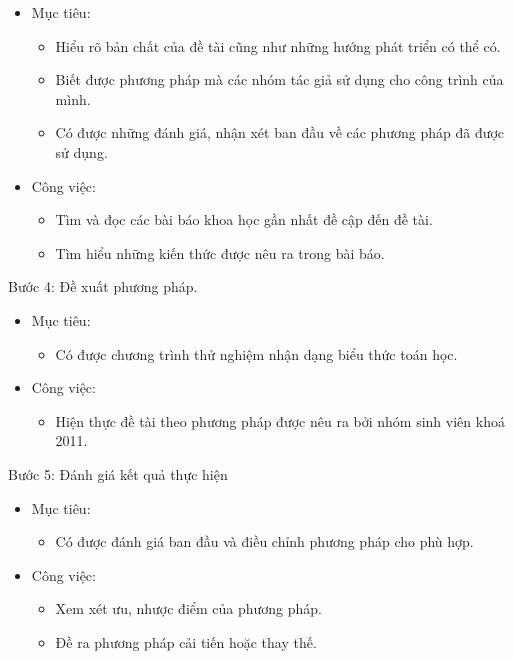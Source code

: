 \documentclass[a4paper,12pt]{article}
\begin{document}
	\begin{itemize}
		\item Mục tiêu: 
		\begin{itemize}
			\item Hiểu rõ bản chất của đề tài cũng như những hướng phát triển có thể có.
			\item Biết được phương pháp mà các nhóm tác giả sử dụng cho công trình của mình.
			\item Có được những đánh giá, nhận xét ban đầu về các phương pháp đã được sử dụng.
		\end{itemize}
		\item Công việc:
		\begin{itemize}
			\item Tìm và đọc các bài báo khoa học gần nhất đề cập đến đề tài.
			\item Tìm hiểu những kiến thức được nêu ra trong bài báo.
			
		\end{itemize}
	\end{itemize}
	Bước 4: Đề xuất phương pháp.
	\begin{itemize}
		\item Mục tiêu:
		\begin{itemize}
			\item Có được chương trình thử nghiệm nhận dạng biểu thức toán học.
			
		\end{itemize}
		\item Công việc:
		\begin{itemize}
			\item Hiện thực đề tài theo phương pháp được nêu ra bởi nhóm sinh viên khoá 2011.
			
		\end{itemize}
	\end{itemize}
	Bước 5: Đánh giá kết quả thực hiện
	\begin{itemize}
		\item Mục tiêu:
		\begin{itemize}
			\item Có được đánh giá ban đầu và điều chỉnh phương pháp cho phù hợp.
			
		\end{itemize}
		\item Công việc:
		\begin{itemize}
			\item Xem xét ưu, nhược điểm của phương pháp.
			\item Đề ra phương pháp cải tiến hoặc thay thế.
		\end{itemize}
	\end{itemize}
	
\end{document}
